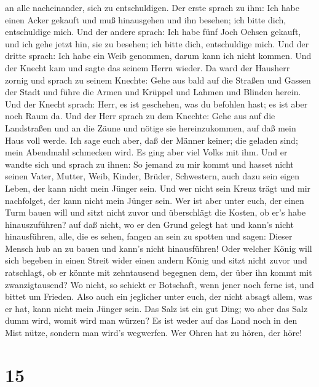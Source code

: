 an alle nacheinander, sich zu entschuldigen. Der erste sprach zu ihm:
Ich habe einen Acker gekauft und muß hinausgehen und ihn besehen; ich
bitte dich, entschuldige mich.  Und der andere sprach: Ich
habe fünf Joch Ochsen gekauft, und ich gehe jetzt hin, sie zu besehen;
ich bitte dich, entschuldige mich.  Und der dritte sprach:
Ich habe ein Weib genommen, darum kann ich nicht kommen. 
Und der Knecht kam und sagte das seinem Herrn wieder. Da ward der
Hausherr zornig und sprach zu seinem Knechte: Gehe aus bald auf die
Straßen und Gassen der Stadt und führe die Armen und Krüppel und Lahmen
und Blinden herein.  Und der Knecht sprach: Herr, es ist
geschehen, was du befohlen hast; es ist aber noch Raum da. 
Und der Herr sprach zu dem Knechte: Gehe aus auf die Landstraßen und an
die Zäune und nötige sie hereinzukommen, auf daß mein Haus voll werde.
 Ich sage euch aber, daß der Männer keiner; die geladen
sind; mein Abendmahl schmecken wird.  Es ging aber viel
Volks mit ihm. Und er wandte sich und sprach zu ihnen:  So
jemand zu mir kommt und hasset nicht seinen Vater, Mutter, Weib, Kinder,
Brüder, Schwestern, auch dazu sein eigen Leben, der kann nicht mein
Jünger sein.  Und wer nicht sein Kreuz trägt und mir
nachfolget, der kann nicht mein Jünger sein.  Wer ist aber
unter euch, der einen Turm bauen will und sitzt nicht zuvor und
überschlägt die Kosten, ob er's habe hinauszuführen?  auf
daß nicht, wo er den Grund gelegt hat und kann's nicht hinausführen,
alle, die es sehen, fangen an sein zu spotten  und sagen:
Dieser Mensch hub an zu bauen und kann's nicht hinausführen!
 Oder welcher König will sich begeben in einen Streit wider
einen andern König und sitzt nicht zuvor und ratschlagt, ob er könnte
mit zehntausend begegnen dem, der über ihn kommt mit zwanzigtausend?
 Wo nicht, so schickt er Botschaft, wenn jener noch ferne
ist, und bittet um Frieden.  Also auch ein jeglicher unter
euch, der nicht absagt allem, was er hat, kann nicht mein Jünger sein.
 Das Salz ist ein gut Ding; wo aber das Salz dumm wird,
womit wird man würzen?  Es ist weder auf das Land noch in
den Mist nütze, sondern man wird's wegwerfen. Wer Ohren hat zu hören,
der höre!

\hypertarget{section-14}{%
\section{15}\label{section-14}}

